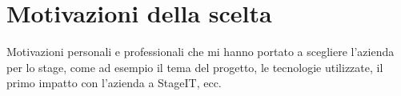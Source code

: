 \section{Motivazioni della scelta}
\label{sez:motivazioni-scelta}

Motivazioni personali e professionali che mi hanno portato a scegliere l'azienda per lo stage, come ad esempio il tema del progetto, le tecnologie utilizzate, 
il primo impatto con l'azienda a StageIT, ecc.\\